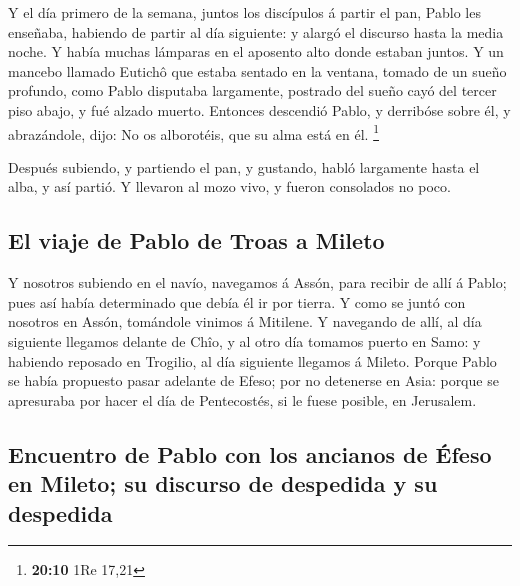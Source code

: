  Y el día primero de la semana, juntos los discípulos á
partir el pan, Pablo les enseñaba, habiendo de partir al día siguiente:
y alargó el discurso hasta la media noche.  Y había muchas
lámparas en el aposento alto donde estaban juntos.  Y un
mancebo llamado Eutichô que estaba sentado en la ventana, tomado de un
sueño profundo, como Pablo disputaba largamente, postrado del sueño cayó
del tercer piso abajo, y fué alzado muerto.  Entonces
descendió Pablo, y derribóse sobre él, y abrazándole, dijo: No os
alborotéis, que su alma está en él. \footnote{\textbf{20:10} 1Re 17,21}

 Después subiendo, y partiendo el pan, y gustando, habló
largamente hasta el alba, y así partió.  Y llevaron al mozo
vivo, y fueron consolados no poco.

\hypertarget{el-viaje-de-pablo-de-troas-a-mileto}{%
\subsection{El viaje de Pablo de Troas a
Mileto}\label{el-viaje-de-pablo-de-troas-a-mileto}}

 Y nosotros subiendo en el navío, navegamos á Assón, para
recibir de allí á Pablo; pues así había determinado que debía él ir por
tierra.  Y como se juntó con nosotros en Assón, tomándole
vinimos á Mitilene.  Y navegando de allí, al día siguiente
llegamos delante de Chîo, y al otro día tomamos puerto en Samo: y
habiendo reposado en Trogilio, al día siguiente llegamos á Mileto.
 Porque Pablo se había propuesto pasar adelante de Efeso;
por no detenerse en Asia: porque se apresuraba por hacer el día de
Pentecostés, si le fuese posible, en Jerusalem.

\hypertarget{encuentro-de-pablo-con-los-ancianos-de-uxe9feso-en-mileto-su-discurso-de-despedida-y-su-despedida}{%
\subsection{Encuentro de Pablo con los ancianos de Éfeso en Mileto; su
discurso de despedida y su
despedida}\label{encuentro-de-pablo-con-los-ancianos-de-uxe9feso-en-mileto-su-discurso-de-despedida-y-su-despedida}}

